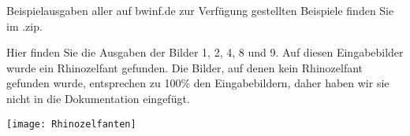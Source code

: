 Beispielausgaben aller auf bwinf.de zur Verfügung gestellten Beispiele finden Sie im .zip.

Hier finden Sie die Ausgaben der Bilder 1, 2, 4, 8 und 9. Auf diesen Eingabebilder wurde ein Rhinozelfant gefunden. Die Bilder, auf denen kein Rhinozelfant gefunden wurde, entsprechen zu 100\% den Eingabebildern, daher haben wir sie nicht in die Dokumentation eingefügt.

\vspace{2em}
\texttt{[image: Rhinozelfanten]}